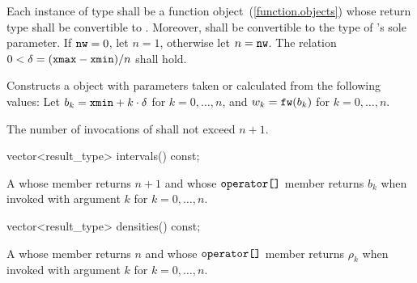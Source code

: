 \begin{itemdescr}
\pnum\requires
 Each instance of type 
 shall be a function object~(\ref{function.objects})
 whose return type shall be convertible to .
 Moreover,
  shall be convertible
 to the type of 's sole parameter.
 If $ \texttt{nw} = 0 $, let $ n = 1 $, otherwise let $n = \texttt{nw}$.
 The relation $ 0 < \delta = (\texttt{xmax} - \texttt{xmin}) / n $
 shall hold.

\pnum\effects Constructs a  object
 with parameters taken or calculated
 from the following values:
 Let $ b_k = \texttt{xmin} + k \cdot \delta $ for $ k = 0, \ldots, n $,
 and $ w_k = \texttt{fw}(b_k) $ for $ k = 0, \ldots, n $.

\pnum\complexity
 The number of invocations of  shall not exceed $n+1$.
\end{itemdescr}

%
%
\begin{itemdecl}
vector<result_type> intervals() const;
\end{itemdecl}

\begin{itemdescr}
\pnum\returns A 
 whose  member returns $n + 1$
 and whose $ \texttt{operator[]} $ member returns $b_k$
 when invoked with argument $k$ for $k = 0, \ldots, n $.
\end{itemdescr}

%
%
\begin{itemdecl}
vector<result_type> densities() const;
\end{itemdecl}

\begin{itemdescr}
\pnum\returns A 
 whose  member returns $n$
 and whose $ \texttt{operator[]} $ member returns $\rho_k$
 when invoked with argument $k$ for $ k = 0, \ldots, n $.
\end{itemdescr}%
%
%
%
%



